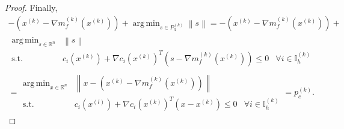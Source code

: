 \documentclass{article}
\theoremstyle{case}
\numberwithin{theorem}{subsection}
\DeclareMathOperator*{\argmin}{arg\,min}
\newcommand{\gk}{{\nabla m_f^{(k)}\left(\xk\right)}}
\newcommand{\Rn}{\mathbb R^n}
\newcommand{\xk}{x^{(k)}}
\newcommand{\xl}{{x^{(l)}}}
\newcommand{\trueprojk}{{p_c^{(k)}}}
\newcommand{\activeindicesk}{{ \mathbb I_h^{(k)} }}
\begin{document}
\begin{proof}
Finally,
\begin{align*}
-\left(\xk - \gk\right) + \argmin_{s \in P^{(k)}_3} \left\|s\right\|
= -\left(\xk - \gk\right) + \\
\begin{array}{ccc}
\argmin_{s \in \Rn} & \left\|s\right\| & \\
\textrm{s.t.} & c_i\left(\xk\right) + \nabla c_i\left(\xk\right)^T\left(s - \gk\right) \le 0& \forall i \in \activeindicesk
\end{array} \\
=
\begin{array}{ccc}
\argmin_{x \in \Rn} & \left\|x - \left(\xk - \gk\right)\right\| & \\
\textrm{s.t.} & c_i \left(\xl\right) + \nabla c_i\left(\xk\right) ^T\left(x - \xk \right) \le 0& \forall i \in \activeindicesk
\end{array} = \trueprojk.
\end{align*}
\end{proof}
\end{document}

